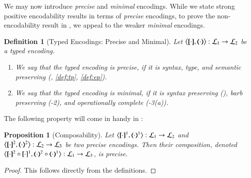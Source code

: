 \documentclass[preprint,11pt]{elsarticle}
\newtheorem{definition}{Definition}[section]
\newtheorem{proposition}{Proposition}[section]
\begin{document}
{{We may now introduce 
\emph{precise} and \emph{minimal}
 encodings.
While we state strong positive encodability results %
in terms of {\em precise} encodings,
to prove the non-encodability result in , 
we appeal to the weaker {\em minimal} encodings.  

\begin{definition}[Typed Encodings: Precise and Minimal]%
\label{def:goodenc}
Let $\enco{\map{\cdot}, \mapt{\cdot}}: \tyl{L}_1 \to \tyl{L}_2$ be a typed encoding.
\begin{enumerate}[-]
\item We say that 
	the typed encoding 
	 is 
	\emph{precise}, if it is syntax, type, and semantic preserving (, \ref{def:tp}, \ref{def:ep}).
	\item 
	We say that the typed encoding is
	\emph{minimal}, if it is syntax preserving 
	(),
	barb preserving (-2), 
	and operationally complete (-3(a)).
	\end{enumerate}
\end{definition}




The following property will come in handy in :

\begin{proposition}[Composability]%
	\label{pro:composition}
	Let %
	$\enco{\map{\cdot}^{1}, \mapt{\cdot}^{1}%
	}: \tyl{L}_1 \to \tyl{L}_2$
	and 
	$\enco{\map{\cdot}^{2}, \mapt{\cdot}^{2}%
	}: \tyl{L}_2 \to \tyl{L}_3$
	be two precise %
	encodings.
	Then their composition, denoted 
	$\enco{\map{\cdot}^{2} \circ \map{\cdot}^{1}, \mapt{\cdot}^{2} \circ \mapt{\cdot}^{1} %
	}: \tyl{L}_1 \to \tyl{L}_3$,
	is precise. 
\end{proposition}

\begin{proof}
This follows directly from the definitions.
\end{proof}

}}
\end{document}
